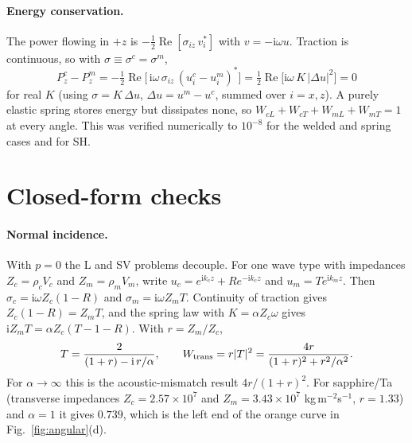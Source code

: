 \documentclass[11pt,a4paper]{article}
\newcommand{\ii}{\mathrm{i}}
\begin{document}
\paragraph{Energy conservation.} The power flowing in $+z$ is
$-\tfrac12\operatorname{Re}[\sigma_{iz}\,v_i^{*}]$ with $v=-\ii\omega u$. Traction is
continuous, so with $\sigma\equiv\sigma^c=\sigma^m$,
\begin{equation}
  P^{c}_z-P^{m}_z=-\tfrac12\operatorname{Re}\!\big[\,\ii\omega\,\sigma_{iz}\,(u^c_i-u^m_i)^{*}\big]
   =\tfrac12\operatorname{Re}\!\big[\ii\omega\,K\,|\Delta u|^2\big]=0
\end{equation}
for real $K$ (using $\sigma=K\,\Delta u$, $\Delta u=u^m-u^c$, summed over $i=x,z$). A purely
elastic spring stores energy but dissipates none, so
$W_{cL}+W_{cT}+W_{mL}+W_{mT}=1$ at every angle. This was verified numerically to $10^{-8}$
for the welded and spring cases and for SH.

\section{Closed-form checks}
\label{app:checks}

\paragraph{Normal incidence.} With $p=0$ the L and SV problems decouple. For one wave type with
impedances $Z_c=\rho_cV_c$ and $Z_m=\rho_mV_m$, write
$u_c=e^{\ii k_cz}+Re^{-\ii k_cz}$ and $u_m=T e^{\ii k_mz}$. Then
$\sigma_c=\ii\omega Z_c(1-R)$ and $\sigma_m=\ii\omega Z_mT$. Continuity of traction gives
$Z_c(1-R)=Z_mT$, and the spring law with $K=\alpha Z_c\omega$ gives
$\ii Z_mT=\alpha Z_c(T-1-R)$. With $r=Z_m/Z_c$,
\begin{equation}
  T=\frac{2}{(1+r)-\ii\,r/\alpha},\qquad
  W_{\rm trans}=r|T|^2=\frac{4r}{(1+r)^2+r^2/\alpha^2}.
  \label{eq:normal_spring}
\end{equation}
For $\alpha\to\infty$ this is the acoustic-mismatch result $4r/(1+r)^2$. For sapphire/Ta
(transverse impedances $Z_c=2.57\times10^7$ and $Z_m=3.43\times10^7$ kg\,m$^{-2}$s$^{-1}$,
$r=1.33$) and $\alpha=1$ it gives $0.739$, which is the left end of the orange curve in
Fig.~\ref{fig:angular}(d).
\end{document}
